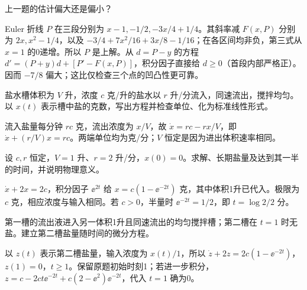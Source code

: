 \begin{exercise}\label{cw:rec03-2}
上一题的估计偏大还是偏小？
\end{exercise}
\begin{solution}
Euler 折线 $P$ 在三段分别为 $x-1,-1/2,-3x/4+1/4$。其斜率减 $F(x,P)$ 分别为 $2x,x^2-1/4$，以及 $-3/4+7x^2/16+3x/8-1/16$；在各区间均非负，第三式从 $x=1$ 的0递增。所以 $P$ 是上解。从 $d=P-y$ 的方程 $d'=(P+y)d+[P'-F(x,P)]$，积分因子直接给 $d\ge0$（首段内部严格正）。因而 $-7/8$ 偏大；这比仅检查三个点的凹凸性更可靠。
\par{}
\end{solution}

\begin{exercise}\label{cw:rec03-3}
盐水槽体积为 $V$ 升，浓度 $c$ 克/升的盐水以 $r$ 升/分流入，同速流出，搅拌均匀。以 $x(t)$ 表示槽中盐的克数，写出方程并检查单位、化为标准线性形式。
\end{exercise}
\begin{solution}
流入盐量每分钟 $rc$ 克，流出浓度为 $x/V$，故 $\dot x=rc-rx/V$，即 $\dot x+(r/V)x=rc$。两端单位均为克/分；$V$ 恒定是因为进出体积速率相同。
\par{}
\end{solution}

\begin{exercise}\label{cw:rec03-4}
设 $c,r$ 恒定，$V=1$ 升、$r=2$ 升/分，$x(0)=0$。求解、长期盐量及达到其一半的时间，并说明物理意义。
\end{exercise}
\begin{solution}
$\dot x+2x=2c$，积分因子 $\ee^{2t}$ 给 $x=c(1-\ee^{-2t})$ 克，其中体积1升已代入。极限为 $c$ 克，相应浓度与输入相同。若 $c>0$，半量时 $\ee^{-2t}=1/2$，即 $t=\log2/2$ 分。
\par{}
\end{solution}

\begin{exercise}\label{cw:rec03-5}
第一槽的流出液进入另一体积1升且同速流出的均匀搅拌槽；第二槽在 $t=1$ 时无盐。建立第二槽盐量随时间的微分方程。
\end{exercise}
\begin{solution}
以 $z(t)$ 表示第二槽盐量，输入浓度为 $x(t)/1$，所以 $\dot z+2z=2c(1-\ee^{-2t})$，$z(1)=0$，$t\ge1$。保留原题初始时刻1；若进一步积分，$z=c-2ct\ee^{-2t}+c(2-\ee^2)\ee^{-2t}$，代入 $t=1$ 确为0。
\par{}
\end{solution}

